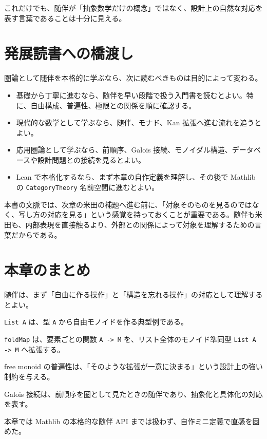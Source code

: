 これだけでも、随伴が「抽象数学だけの概念」ではなく、設計上の自然な対応を表す言葉であることは十分に見える。

\section{発展読書への橋渡し}
\label{sec:ch31-further-reading}

圏論として随伴を本格的に学ぶなら、次に読むべきものは目的によって変わる。

\begin{itemize}
\item 基礎から丁寧に進むなら、随伴を早い段階で扱う入門書を読むとよい。特に、自由構成、普遍性、極限との関係を順に確認する。
\item 現代的な数学として学ぶなら、随伴、モナド、Kan 拡張へ進む流れを追うとよい。
\item 応用圏論として学ぶなら、前順序、Galois 接続、モノイダル構造、データベースや設計問題との接続を見るとよい。
\item Lean で本格化するなら、まず本章の自作定義を理解し、その後で Mathlib の \texttt{CategoryTheory} 名前空間に進むとよい。
\end{itemize}

本書の文脈では、次章の米田の補題へ進む前に、「対象そのものを見るのではなく、写し方の対応を見る」という感覚を持っておくことが重要である。随伴も米田も、内部表現を直接触るより、外部との関係によって対象を理解するための言葉だからである。

\section{本章のまとめ}
\label{sec:ch31-summary}

随伴は、まず「自由に作る操作」と「構造を忘れる操作」の対応として理解するとよい。

\texttt{List A} は、型 \texttt{A} から自由モノイドを作る典型例である。

\texttt{foldMap} は、要素ごとの関数 \texttt{A -> M} を、リスト全体のモノイド準同型 \texttt{List A -> M} へ拡張する。

free monoid の普遍性は、「そのような拡張が一意に決まる」という設計上の強い制約を与える。

Galois 接続は、前順序を圏として見たときの随伴であり、抽象化と具体化の対応を表す。

本章では Mathlib の本格的な随伴 API までは扱わず、自作ミニ定義で直感を固めた。
